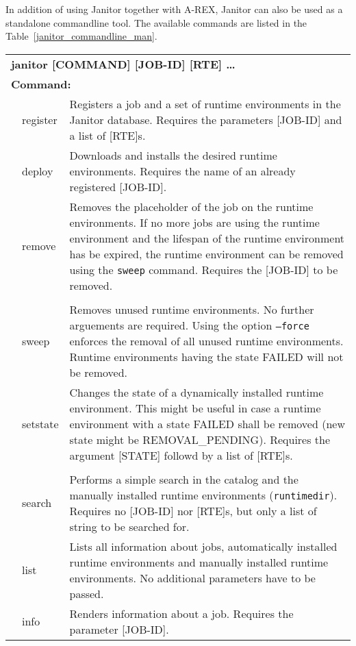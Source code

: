 In addition of using Janitor together with A-REX, Janitor can also be used as a standalone commandline tool.
The available commands are listed in the Table~\ref{janitor_commandline_man}.
\begin{table}[!h]
   \begin{center}
        \label{tab:janitor_commandline_man}
	\begin{tabular}{p{0.5cm}p{2cm}p{11cm}}
	\multicolumn{3}{l}{\textbf{janitor [COMMAND] [JOB-ID] [RTE] \dots}} \\
	\multicolumn{3}{l}{\textbf{Command:}}\\
	&	register			& Registers a job and a set of runtime environments in the Janitor database. Requires the parameters [JOB-ID] and a list of [RTE]s.\\
	&	deploy				& Downloads and installs the desired runtime environments. Requires the name of an already registered [JOB-ID].\\
	&	remove				& Removes the placeholder of the job on the runtime environments. If no more jobs are using the runtime environment and the lifespan of the runtime environment has be expired, the runtime environment can be removed using the \texttt{sweep} command. Requires the [JOB-ID] to be removed.\\
	&					&\\
	&	sweep				& Removes unused runtime environments. No further arguements are required. Using the option \texttt{--force} enforces the removal of all unused runtime environments. Runtime environments having the state FAILED will not be removed.\\
	&	setstate			& Changes the state of a dynamically installed runtime environment. This might be useful in case a runtime environment with a state FAILED shall be removed (new state might be REMOVAL\_PENDING). Requires the argument [STATE] followd by a list of [RTE]s.\\
	&					&\\
	&	search				& Performs a simple search in the catalog and the manually installed runtime environments (\texttt{runtimedir}). Requires no [JOB-ID] nor [RTE]s, but only a list of string to be searched for.\\
	&	list				& Lists all information about jobs, automatically installed runtime environments and manually installed runtime environments. No additional parameters have to be passed.\\
	&	info				& Renders information about a job. Requires the parameter [JOB-ID].\\

\end{tabular}
\end{center}
\end{table}
